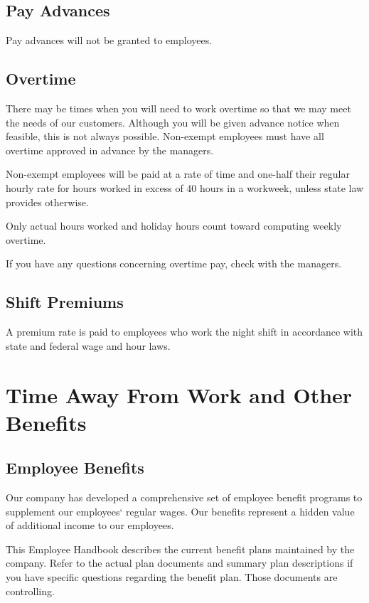 \documentclass{book}
\begin{document}
\subsection{Pay Advances}

Pay advances will not be granted to employees.

\subsection{Overtime}

There may be times when you will need to work overtime so that we may meet the needs of our customers. Although you will be given advance notice when feasible, this is not always possible. Non-exempt employees must have all overtime approved in advance by the managers.

Non-exempt employees will be paid at a rate of time and one-half their regular hourly rate for hours worked in excess of 40 hours in a workweek, unless state law provides otherwise.

Only actual hours worked and holiday hours count toward computing weekly overtime.

If you have any questions concerning overtime pay, check with the managers.

\subsection{Shift Premiums}

A premium rate is paid to employees who work the night shift in accordance with state and federal wage and hour laws.

\section{Time Away From Work and Other Benefits}

\subsection{Employee Benefits}

Our company has developed a comprehensive set of employee benefit programs to supplement our employees‘ regular wages. Our benefits represent a hidden value of additional income to our employees.

This Employee Handbook describes the current benefit plans maintained by the company. Refer to the actual plan documents and summary plan descriptions if you have specific questions regarding the benefit plan. Those documents are controlling.
\end{document}
